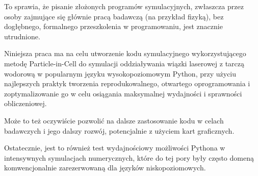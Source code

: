     To sprawia, że pisanie złożonych programów symulacyjnych, zwłaszcza przez osoby
    zajmujące się głównie pracą badawczą (na przykład fizyką), bez dogłębnego, formalnego przeszkolenia
    w programowaniu, jest znacznie utrudnione.

    Niniejsza praca ma na celu utworzenie kodu symulacyjnego wykorzystującego metodę Particle-in-Cell
    do symulacji oddziaływania wiązki laserowej z tarczą wodorową w popularnym języku
    wysokopoziomowym Python, przy użyciu najlepszych praktyk tworzenia reprodukowalnego, otwartego oprogramowania
    i zoptymalizowanie go w celu osiągania maksymalnej wydajności i sprawności obliczeniowej.

    Może to też oczywiście pozwolić na dalsze
    zastosowanie kodu w celach badawczych i jego dalszy rozwój, potencjalnie z użyciem kart graficznych.

    Ostatecznie, jest to również test wydajnościowy możliwości Pythona w intensywnych symulacjach 
    numerycznych, które do tej pory były często domeną komwencjonalnie
    zarezerwowaną dla języków niskopoziomowych.
